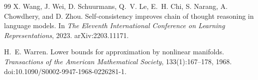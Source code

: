 \documentclass[11pt]{article}
\begin{document}
\begin{thebibliography}{99}
X. Wang, J. Wei, D. Schuurmans, Q.~V. Le, E.~H. Chi, S. Narang, A. Chowdhery, and D. Zhou.
\newblock Self-consistency improves chain of thought reasoning in language models.
\newblock In \emph{The Eleventh International Conference on Learning Representations}, 2023.
\newblock arXiv:2203.11171.

H.~E. Warren.
\newblock Lower bounds for approximation by nonlinear manifolds.
\newblock \emph{Transactions of the American Mathematical Society}, 133(1):167--178, 1968.
\newblock doi:10.1090/S0002-9947-1968-0226281-1.

\end{thebibliography}
\end{document}

